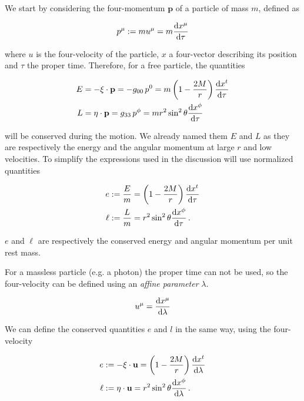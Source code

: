We start by considering the four-momentum $\mathbf{p}$ of a particle of mass
$m$, defined as

\begin{equation}
    p^\mu := m u^\mu = m \dv{x^\mu}{\tau}
\end{equation}

where $u$ is the four-velocity of the particle, $x$ a four-vector describing its
position and $\tau$ the
proper time.
Therefore, for a free particle, the quantities

\begin{align*}
    E &= - \mathbf{\xi \cdot p} =
    - g_{00} \, p^0 = m \left( 1 - \frac{2M}{r} \right) \dv{x^t}{\tau} \\
    L &= \mathbf{\eta \cdot p} =
    g_{33} \, p^\phi = m r^2 \sin^2 \theta \dv{x^\phi}{\tau}
\end{align*}

will be conserved during the motion.
We already named them $E$ and $L$ as they are respectively the energy and the
angular momentum at large $r$ and low velocities.
To simplify the expressions used in the discussion will use normalized
quantities

\begin{subequations}
    \begin{align}
        e &:= \frac{E}{m} = \left( 1 - \frac{2M}{r} \right) \dv{x^t}{\tau}
        \label{cap1:eq:conserved_e} \\
        \ell &:= \frac{L}{m} = r^2 \sin^2 \theta \dv{x^\phi}{\tau} \, .
        \label{cap1:eq:conserved_l}
    \end{align}
\end{subequations}

$e$ and $\ell$ are respectively the conserved energy and angular momentum per
unit
rest mass.

For a massless particle (e.g. a photon) the proper time can not be used, so
the four-velocity can be defined using an \textit{affine parameter} $\lambda$.

\begin{equation}
    u^\mu = \dv{x^\mu}{\lambda}
    \label{cap1:eq:u_light}
\end{equation}

We can define the conserved quantities $e$ and $l$ in the same way, using the
four-velocity

\begin{subequations}
    \begin{align}
        e &:= - \xi \cdot \mathbf{u}
        = \left( 1 - \frac{2M}{r} \right) \dv{x^t}{\lambda} \\
        \ell &:= \eta \cdot \mathbf{u} 
        = r^2 \sin^2 \theta \dv{x^\phi}{\lambda} \, .
        \label{cap1:eq:e_light}
    \end{align}
    \label{cap1:eq:conserved_light}    
\end{subequations}

